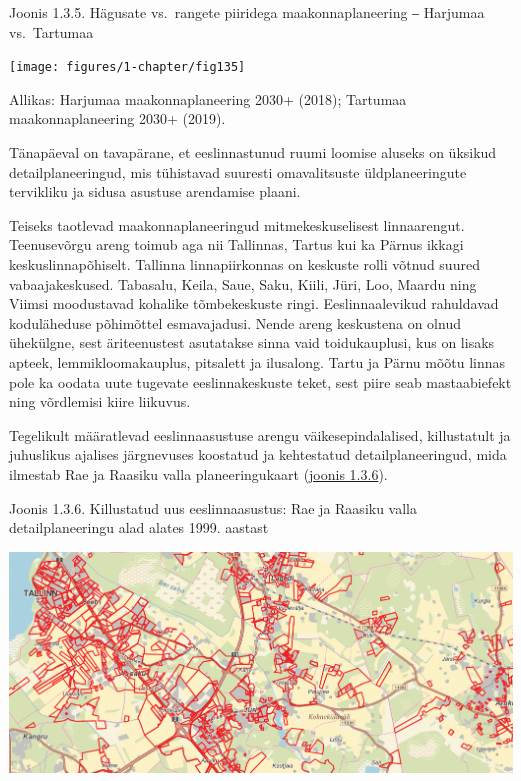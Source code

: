 \documentclass[estonian,]{article}
\begin{document}
{Joonis 1.3.5.} Hägusate vs.~rangete piiridega maakonnaplaneering ‒ Harjumaa vs.~Tartumaa

\begin{center}\texttt{[image: figures/1-chapter/fig135]} \end{center}

\begin{imgsource}
{Allikas:} Harjumaa maakonnaplaneering 2030+ (2018); Tartumaa
maakonnaplaneering 2030+ (2019).
\end{imgsource}

\begin{blockquote-right}
Tänapäeval on tavapärane, et eeslinnastunud ruumi loomise aluseks on
üksikud detailplaneeringud, mis tühistavad suuresti omavalitsuste
üldplaneeringute tervikliku ja sidusa asustuse arendamise plaani.
\end{blockquote-right}

Teiseks taotlevad maakonnaplaneeringud mitmekeskuselisest linnaarengut. Teenusevõrgu areng toimub aga nii Tallinnas, Tartus kui ka Pärnus ikkagi keskuslinnapõhiselt. Tallinna linnapiirkonnas on keskuste rolli võtnud suured vabaajakeskused. Tabasalu, Keila, Saue, Saku, Kiili, Jüri, Loo, Maardu ning Viimsi moodustavad kohalike tõmbekeskuste ringi. Eeslinnaalevikud rahuldavad koduläheduse põhimõttel esmavajadusi. Nende areng keskustena on olnud ühekülgne, sest äriteenustest asutatakse sinna vaid toidukauplusi, kus on lisaks apteek, lemmikloomakauplus, pitsalett ja ilusalong. Tartu ja Pärnu mõõtu linnas pole ka oodata uute tugevate eeslinnakeskuste teket, sest piire seab mastaabiefekt ning võrdlemisi kiire liikuvus.

Tegelikult määratlevad eeslinnaasustuse arengu väikesepindalalised, killustatult ja juhuslikus ajalises järgnevuses koostatud ja kehtestatud detailplaneeringud, mida ilmestab Rae ja Raasiku valla planeeringukaart (\protect\hyperlink{figure136}{joonis 1.3.6}).

{Joonis 1.3.6.} Killustatud uus eeslinnaasustus: Rae ja Raasiku valla detailplaneeringu alad alates 1999. aastast

\begin{center}\includegraphics[width=0.9\linewidth]{figures/1-chapter/fig136} \end{center}
\end{document}
